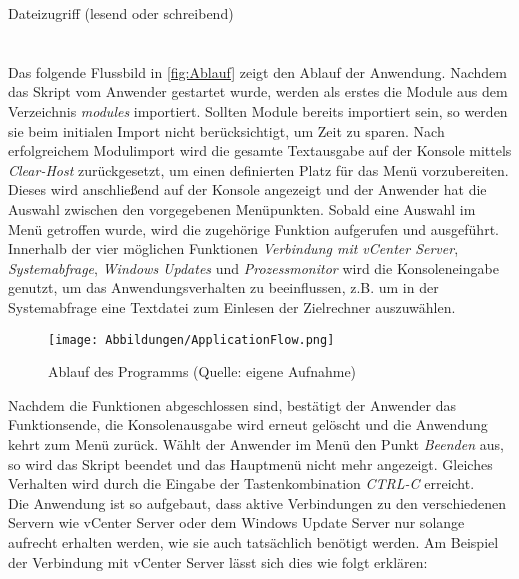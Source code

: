 Dateizugriff (lesend oder schreibend)\\\vspace{1.5cm}\\\\
Das folgende Flussbild in \autoref{fig:Ablauf} zeigt den Ablauf der Anwendung. Nachdem das Skript vom Anwender gestartet wurde, werden als erstes die Module aus dem Verzeichnis \textit{modules} importiert. Sollten Module bereits importiert sein, so werden sie beim initialen Import nicht berücksichtigt, um Zeit zu sparen. Nach erfolgreichem Modulimport wird die gesamte Textausgabe auf der Konsole mittels \textit{Clear-Host} zurückgesetzt, um einen definierten Platz für das Menü vorzubereiten. Dieses wird anschließend auf der Konsole angezeigt und der Anwender hat die Auswahl zwischen den vorgegebenen Menüpunkten. Sobald eine Auswahl im Menü getroffen wurde, wird die zugehörige Funktion aufgerufen und ausgeführt. Innerhalb der vier möglichen Funktionen \textit{Verbindung mit vCenter Server}, \textit{Systemabfrage}, \textit{Windows Updates} und \textit{Prozessmonitor} wird die Konsoleneingabe genutzt, um das Anwendungsverhalten zu beeinflussen, z.B. um in der Systemabfrage eine Textdatei zum Einlesen der Zielrechner auszuwählen.
\begin{figure}[H]
    \centering
    \texttt{[image: Abbildungen/ApplicationFlow.png]}
    \caption[Ablauf des Programms]{Ablauf des Programms (Quelle: eigene Aufnahme)} 
    \label{fig:Ablauf}
\end{figure}
Nachdem die Funktionen abgeschlossen sind, bestätigt der Anwender das Funktionsende, die Konsolenausgabe wird erneut gelöscht und die Anwendung kehrt zum Menü zurück. Wählt der Anwender im Menü den Punkt \textit{Beenden} aus, so wird das Skript beendet und das Hauptmenü nicht mehr angezeigt. Gleiches Verhalten wird durch die Eingabe der Tastenkombination \textit{CTRL-C} erreicht.\medskip\\
Die Anwendung ist so aufgebaut, dass aktive Verbindungen zu den verschiedenen Servern wie vCenter Server oder dem Windows Update Server nur solange aufrecht erhalten werden, wie sie auch tatsächlich benötigt werden. Am Beispiel der Verbindung mit vCenter Server lässt sich dies wie folgt erklären:\medskip\\
